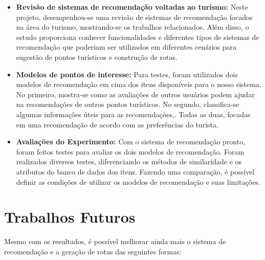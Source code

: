 \begin{itemize}
    \item \textbf{Revisão de sistemas de recomendação voltadas ao turismo:} Neste projeto, desempenhou-se uma revisão de sistemas de recomendação focados na área do turismo, mostrando-se os trabalhos relacionados. Além disso, o estudo proporciona conhecer funcionalidades e diferentes tipos de sistemas de recomendação que poderiam ser utilizados em diferentes cenários para sugestão de pontos turísticos e construção de rotas.
    
    \item \textbf{Modelos de pontos de interesse:} Para testes, foram utilizados dois modelos de recomendação em cima dos itens disponíveis para o nosso sistema. No primeiro, mostra-se como as avaliações de outros usuários podem ajudar na recomendações de outros pontos turísticos. No segundo, classifica-se algumas informações úteis para as recomendações,. Todas as duas, focadas em uma recomendação de acordo com as preferências do turista.
    
    \item \textbf{Avaliações do Experimento:} Com o sistema de recomendação pronto, foram feitos testes para avaliar os dois modelos de recomendação. Foram realizados diversos testes, diferenciando os métodos de similaridade e os atributos do banco de dados dos itens. Fazendo uma comparação, é possível definir as condições de utilizar os modelos de recomendação e suas limitações.
\end{itemize}

\section{Trabalhos Futuros}

Mesmo com os resultados, é possível melhorar ainda mais o sistema de recomendação e a geração de rotas das seguintes formas:

